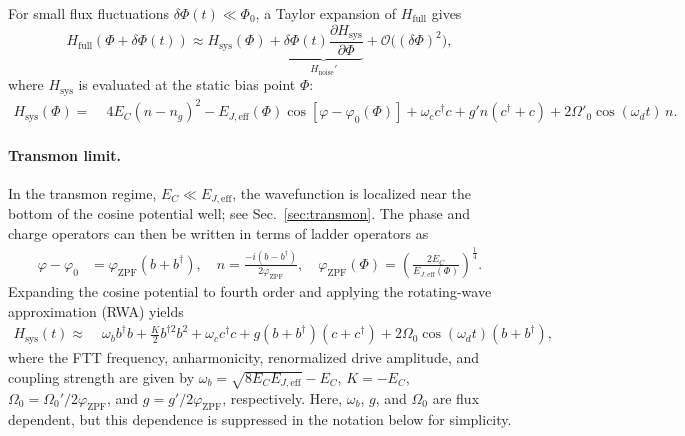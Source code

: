 For small flux fluctuations \(\delta\Phi(t)\ll\Phi_0\), a Taylor expansion of \(H_{\text{full}}\) gives
\begin{equation}
H_{\text{full}}\!\left(\Phi+\delta\Phi(t)\right)
\approx H_{\text{sys}}(\Phi) + \underbrace{\delta\Phi(t)\frac{\partial H_{\text{sys}}}{\partial \Phi}}_{H_{\text{noise}}'} 
+ \mathcal{O}\big((\delta \Phi)^2\big),
\end{equation}
where \(H_{\text{sys}}\) is evaluated at the static bias point \(\Phi\):
\begin{equation}
\begin{aligned}
\label{system hamiltonian}
H_{\text{sys}}(\Phi) =\; & 4E_C (n-n_g)^2
- E_{J,\mathrm{eff}}(\Phi)
\cos\!\left[{\varphi}-{\varphi_0(\Phi)}\right]  + \omega_c c^{\dagger}c
+ g' n (c^{\dagger}+c)
+ 2\Omega'_0 \cos(\omega_d t)\, n.
\end{aligned}
\end{equation}

\paragraph{Transmon limit.}
In the transmon regime, \(E_C \ll E_{J,\text{eff}}\), the wavefunction is localized near the bottom of the cosine potential well; see Sec.~\ref{sec:transmon}. The phase and charge operators can then be written in terms of ladder operators as
\begin{equation}
\begin{aligned}
    \varphi - \varphi_0 &= \varphi_{\text{ZPF}} \left( b + b^\dagger \right), \quad n = \frac{-i \left( b - b^\dagger \right)}{2 \varphi_{\text{ZPF}}}, \quad\varphi_{\text{ZPF}}(\Phi) = \left( \frac{2 E_C}{E_{J,\text{eff}} (\Phi)} \right)^{\frac{1}{4}}.
\end{aligned}
\end{equation}
Expanding the cosine potential to fourth order and applying the rotating-wave approximation (RWA) yields
\begin{equation}
\begin{split}
    H_\text{sys}(t) \approx \; & \omega_{b} b^{\dagger} b + \frac{K}{2} b^{\dagger 2} b^{2} + \omega_c c^\dagger c + g (b + b^{\dagger})(c + c^{\dagger}) + 2\Omega_0\cos(\omega_{d}t)(b + b^{\dagger}),
\end{split}
\end{equation}
where the FTT frequency, anharmonicity, renormalized drive amplitude, and coupling strength are given by \(\omega_{b} = \sqrt{8E_{C}E_{J,\text{eff}} } - E_{C}\), \(K = -E_{C}\), \(\Omega_0 = \Omega_0'/2\varphi_{\text{ZPF}}\), and \(g = g'/2\varphi_{\text{ZPF}}\), respectively. Here, \(\omega_b\), \(g\), and \(\Omega_0\) are flux dependent, but this dependence is suppressed in the notation below for simplicity.

